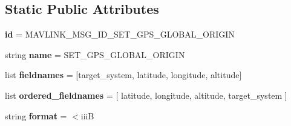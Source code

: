 \subsection*{Static Public Attributes}
\begin{DoxyCompactItemize}
\item 
\mbox{\label{classpymavlink_1_1dialects_1_1v10_1_1MAVLink__set__gps__global__origin__message_a77c4821634ce9a15611d10905a817192}} 
{\bfseries id} = M\+A\+V\+L\+I\+N\+K\+\_\+\+M\+S\+G\+\_\+\+I\+D\+\_\+\+S\+E\+T\+\_\+\+G\+P\+S\+\_\+\+G\+L\+O\+B\+A\+L\+\_\+\+O\+R\+I\+G\+IN
\item 
\mbox{\label{classpymavlink_1_1dialects_1_1v10_1_1MAVLink__set__gps__global__origin__message_aeb2047f45b285789a44f9d06036a30d6}} 
string {\bfseries name} = \textquotesingle{}S\+E\+T\+\_\+\+G\+P\+S\+\_\+\+G\+L\+O\+B\+A\+L\+\_\+\+O\+R\+I\+G\+IN\textquotesingle{}
\item 
\mbox{\label{classpymavlink_1_1dialects_1_1v10_1_1MAVLink__set__gps__global__origin__message_a53da9762062d14c1ef258ab1d1cdbe58}} 
list {\bfseries fieldnames} = \mbox{[}\textquotesingle{}target\+\_\+system\textquotesingle{}, \textquotesingle{}latitude\textquotesingle{}, \textquotesingle{}longitude\textquotesingle{}, \textquotesingle{}altitude\textquotesingle{}\mbox{]}
\item 
\mbox{\label{classpymavlink_1_1dialects_1_1v10_1_1MAVLink__set__gps__global__origin__message_a65efd76cfce0a22beae9c7208d813b25}} 
list {\bfseries ordered\+\_\+fieldnames} = \mbox{[} \textquotesingle{}latitude\textquotesingle{}, \textquotesingle{}longitude\textquotesingle{}, \textquotesingle{}altitude\textquotesingle{}, \textquotesingle{}target\+\_\+system\textquotesingle{} \mbox{]}
\item 
\mbox{\label{classpymavlink_1_1dialects_1_1v10_1_1MAVLink__set__gps__global__origin__message_adbf908a60c52547fad0a65dc7d384ddb}} 
string {\bfseries format} = \textquotesingle{}$<$iiiB\textquotesingle{}

\end{DoxyCompactItemize}
